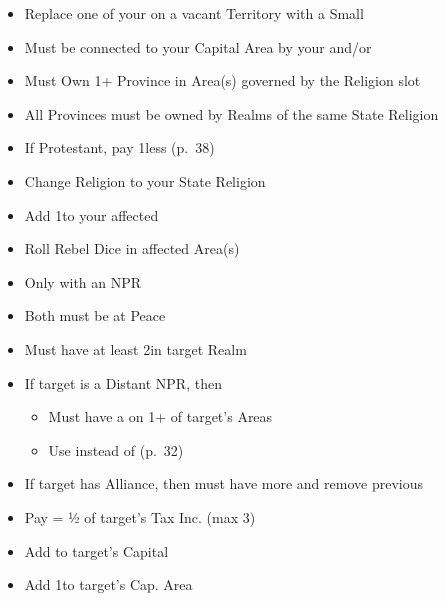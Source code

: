 \documentclass[10pt]{article}
\begin{document}
\begin{itemize}
	\item Replace one of your \claims on a vacant Territory with a Small \town
	\item Must be connected to your Capital Area by your \towns and/or \ships
\end{itemize}

\begin{itemize}
	\item Must Own 1+ Province in Area(s) governed by the Religion slot
	\item All Provinces must be owned by Realms of the same State Religion
	\item If Protestant, pay 1\adminpower less (p.~38)
	\item Change Religion to your State Religion
	\item Add 1\unrest to your affected \towns
	\item Roll Rebel Dice in affected Area(s)
\end{itemize}

\begin{itemize}
	\item Only with an NPR
	\item Both must be at Peace
	\item Must have at least 2\influence in target Realm
	\item If target is a Distant NPR, then 
	\begin{itemize}
		\item Must have a \claim on 1+ of target's Areas
		\item Use \colonist instead of \influence (p.~32)
	\end{itemize}
	\item If target has Alliance, then must have more \influence and remove previous \alliance
	\item Pay \diplopower = ½ of target's Tax Inc. (max 3)
	\item Add \alliance to target's Capital
	\item Add 1\influence to target's Cap. Area
\end{itemize}
\end{document}
